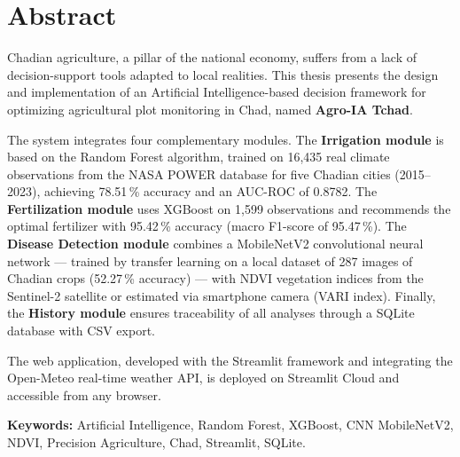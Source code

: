 \chapter*{Abstract}
\thispagestyle{plain}

Chadian agriculture, a pillar of the national economy, suffers
from a lack of decision-support tools adapted to local realities.
This thesis presents the design and implementation of an
Artificial Intelligence-based decision framework for optimizing
agricultural plot monitoring in Chad, named \textbf{Agro-IA
	Tchad}.

\medskip

The system integrates four complementary modules. The
\textbf{Irrigation module} is based on the Random Forest
algorithm, trained on 16,435 real climate observations from the
NASA POWER database for five Chadian cities (2015--2023),
achieving 78.51\,\% accuracy and an AUC-ROC of 0.8782. The
\textbf{Fertilization module} uses XGBoost on 1,599 observations
and recommends the optimal fertilizer with 95.42\,\% accuracy
(macro F1-score of 95.47\,\%). The \textbf{Disease Detection
	module} combines a MobileNetV2 convolutional neural network ---
trained by transfer learning on a local dataset of 287 images of
Chadian crops (52.27\,\% accuracy) --- with NDVI vegetation
indices from the Sentinel-2 satellite or estimated via smartphone
camera (VARI index). Finally, the \textbf{History module} ensures
traceability of all analyses through a SQLite database with CSV
export.

\medskip

The web application, developed with the Streamlit framework and
integrating the Open-Meteo real-time weather API, is deployed on
Streamlit Cloud and accessible from any browser.

\medskip

\noindent\textbf{Keywords:} Artificial Intelligence, Random
Forest, XGBoost, CNN MobileNetV2, NDVI, Precision Agriculture,
Chad, Streamlit, SQLite.
